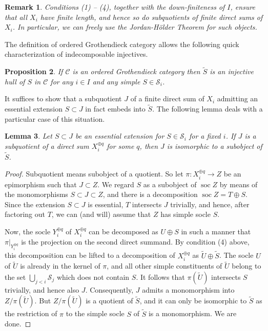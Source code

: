\documentclass[11pt]{article}
\theoremstyle{plain}
\newtheorem{lemma}{Lemma}[section]
\newtheorem{proposition}[lemma]{Proposition}
\theoremstyle{nonumberplain}
\theoremstyle{plain}
\newtheorem{remark}[lemma]{Remark}
\theoremstyle{nonumberplain}
\newtheorem{proof}{Proof}
\newcommand\cC{{\mathcal C}}
\newcommand\cS{{\mathcal S}}
\DeclareMathOperator{\soc}{\mathrm{soc}}
\begin{document}
\begin{remark}
  Conditions (1) -- (4), together with the down-finiteness of $I$, ensure that all $X_i$ have finite length, and hence so do subquotients of finite direct sums of $X_i$. In particular, we can freely use the Jordan-H\"older Theorem for such objects.  
\end{remark}

The definition of ordered Grothendieck category allows the following quick characterization of indecomposable injectives.


\begin{proposition}\label{pr.inj_env}
  If $\cC$ is an ordered Grothendieck category then $\widetilde S$ is an injective hull of $S$ in $\mathcal C$ for any $i\in I$ and any simple $S\in \cS_i$. 
\end{proposition}

It suffices to show that a subquotient $J$ of a finite direct sum of $X_i$ admitting an essential extension $S\subset J$ in fact embeds into $\widetilde S$. The following lemma deals with a particular case of this situation. 

\begin{lemma}\label{le.part}
Let $S\subset J$ be an essential extension for $S\in \cS_i$ for a fixed $i$. If $J$ is a subquotient of a direct sum $X_i^{\oplus q}$ for some $q$, then $J$ is isomorphic to a subobject of $\widetilde S$. 
\end{lemma}
\begin{proof}
Subquotient means subobject of a quotient. So let $\pi:X_i^{\oplus q}\to Z$ be an epimorphism such that $J\subset Z$. We regard $S$ as a subobject of $\soc Z$ by means of the monomorphisms $S\subset J\subset Z$, and there is a decomposition $\soc Z=T\oplus S$. Since the extension $S\subset J$ is essential, $T$ intersects $J$ trivially, and hence, after factoring out $T$, we can (and will) assume that $Z$ has simple socle $S$.



Now, the socle $Y_i^{\oplus q}$ of $X_i^{\oplus q}$ can be decomposed as $U\oplus S$ in such a manner that $\pi|_{Y_i^{\oplus q}}$ is the projection on the second direct summand. By condition (4) above, this decomposition can be lifted to a decomposition of $X_i^{\oplus q}$ as $\widetilde U\oplus\widetilde S$. The socle $U$ of $\widetilde U$ is already in the kernel of $\pi$, and all other simple constituents of $\widetilde U$ belong to the set $\bigcup_{j<i}\mathcal{S}_j$ which does not contain $S$. It follows that $\pi(\widetilde U)$ intersects $S$ trivially, and hence also $J$.  Consequently, $J$ admits a monomorphism into $Z/\pi(\widetilde U)$. But $Z/\pi(\widetilde{U})$ is a quotient of $\widetilde S$, and it can only be isomorphic to $\widetilde S$ as the restriction of $\pi$ to the simple socle $S$ of $\widetilde S$ is a monomorphism. We are done.   
\end{proof}
\end{document}
